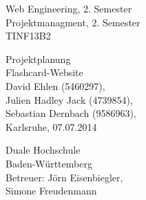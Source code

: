 \documentclass{article}
\newcommand{\appname}{Flashcard-Website}
\begin{document}
\begin{titlepage}
    \large
    \begin{flushleft}
        Web Engineering, 2. Semester \\
        Projektmanagment, 2. Semester\\
        TINF13B2
    \end{flushleft}
    
    \vfill

    \begin{center}
        \Huge Projektplanung\\
        \Large \appname \\
        \vspace{1cm}
        \normalsize David Ehlen (5460297),\\
        Julien Hadley Jack (4739854), \\
        Sebastian Dernbach (9586963), \\
        \vspace\medskipamount
        \vspace\medskipamount
        Karlsruhe, 07.07.2014
    \end{center}
    
    \vfill
    
    \begin{flushright}
        Duale Hochschule \\
        Baden-Württemberg \\
        \vspace\medskipamount
        Betreuer: Jörn Eisenbiegler,\\
        Simone Freudenmann
    \end{flushright}
\end{titlepage}

\newpage

\pagestyle{empty}
\tableofcontents
\cleardoublepage

\setcounter{page}{1}
\pagestyle{plain}









\end{document}
